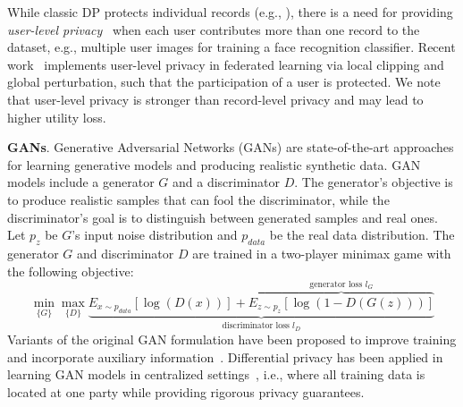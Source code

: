 \documentclass[conference]{IEEEtran}
\newcommand{\partitle}[1]{\smallskip \noindent \textbf{#1}.}
\begin{document}

While classic DP protects individual records (e.g., \cite{DPSGD2016Abadi}), there is a need for providing \textit{user-level privacy}~\cite{dwork_book} when each user contributes more than one record to the dataset, e.g., multiple user images for training a face recognition classifier. Recent work~\cite{DPFedAvg2018} implements user-level privacy in federated learning via local clipping and global perturbation, such that the participation of a user is protected. We note that user-level privacy is stronger than record-level privacy and may lead to higher utility loss.  




\partitle{GANs} Generative Adversarial Networks (GANs) \cite{GANGoodFellow2014} are state-of-the-art approaches for learning generative models and producing realistic synthetic data. GAN models include a generator $G$ and a discriminator $D$. The generator's objective is to produce realistic samples that can fool the discriminator, while the discriminator's goal is to distinguish between generated samples and real ones. Let $p_z$ be $G$'s input noise distribution and $p_{data}$ be the real data distribution. The generator $G$ and discriminator $D$ are trained in a two-player minimax game with the following objective: 
\begin{equation}\label{eq:ganobj}
		\min_{\{G\}} \max_{\{D\}} \underbrace{E_{x \sim p_{data}}[\log(D(x))] 
		+ \overbrace{E_{z \sim p_z} [\log(1 - D(G(z)))]}^{\textrm{generator loss } l_G}}_{\textrm{discriminator loss } l_D}
\end{equation}
Variants of the original GAN formulation have been proposed
to improve training and incorporate auxiliary information~\cite{mirza2014conditional, arjovsky2017wasserstein}. Differential privacy has been applied in learning GAN models in centralized settings~\cite{fan2020survey}, i.e., where all training data is located at one party  while providing rigorous privacy guarantees. 
\end{document}
